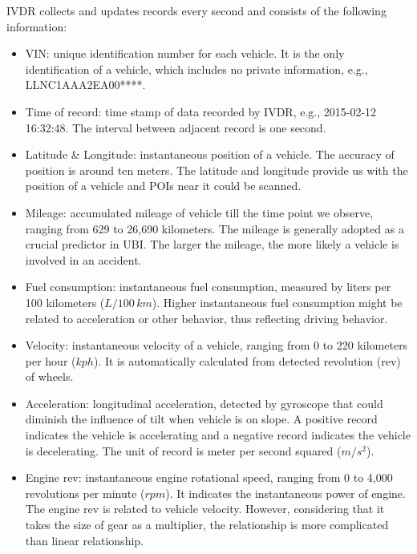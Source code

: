 \documentclass[sii]{ipart}
\theoremstyle{plain}
\begin{document}
IVDR collects and updates records every second and consists of the following information:
\begin{itemize}
	\item VIN: unique identification number for each vehicle. It is the only identification of a vehicle, which includes no private information, e.g., LLNC1AAA2EA00****.
	\item  Time of record: time stamp of data recorded by IVDR, e.g.,  2015-02-12 16:32:48. The interval between adjacent record is one second.
	\item Latitude \& Longitude: instantaneous position of a vehicle. The accuracy of position is around ten meters. The latitude and longitude provide us with the position of a vehicle and POIs near it could be scanned.
	\item Mileage: accumulated mileage of vehicle till the time point we observe, ranging from 629 to 26,690 kilometers. The mileage is generally adopted as a crucial predictor in UBI. The larger the mileage, the more likely a vehicle is involved in an accident.
	\item Fuel consumption: instantaneous fuel consumption, measured by liters per 100 kilometers ($L/100 \, km$). Higher instantaneous fuel consumption might be related to acceleration or other behavior, thus reflecting driving behavior.
	\item Velocity: instantaneous velocity of a vehicle, ranging from 0 to 220 kilometers per hour ($kph$). It is automatically calculated from detected revolution (rev) of wheels.
	\item Acceleration: longitudinal acceleration, detected by gyroscope that could diminish the influence of tilt when vehicle is on slope. A positive record indicates the vehicle is accelerating and a negative record indicates the vehicle is decelerating. The unit of record is meter per second squared ($m / s^{2}$). 
	\item  Engine rev: instantaneous engine rotational speed, ranging from 0 to 4,000 revolutions per minute ($rpm$). It indicates the instantaneous power of engine. The engine rev is related to vehicle velocity. However,  considering that it takes the size of gear as a multiplier, the relationship is more complicated than linear relationship. 
	
	
	
	
\end{itemize}
\end{document}
